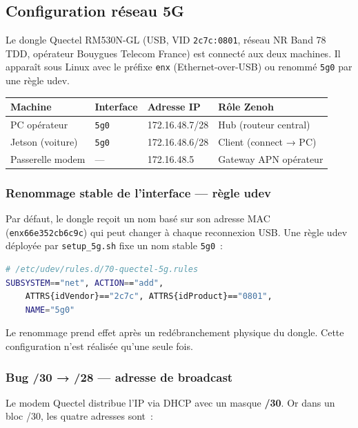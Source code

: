 \documentclass[a4paper,11pt]{article}
\begin{document}
\subsection{Configuration réseau 5G}

Le dongle Quectel RM530N-GL (USB, VID \texttt{2c7c:0801}, réseau NR Band 78 TDD,
opérateur Bouygues Telecom France) est connecté aux deux machines.
Il apparaît sous Linux avec le préfixe \texttt{enx} (Ethernet-over-USB) ou renommé
\texttt{5g0} par une règle udev.

\begin{center}
\begin{tabular}{llll}
\toprule
\textbf{Machine} & \textbf{Interface} & \textbf{Adresse IP} & \textbf{Rôle Zenoh} \\
\midrule
PC opérateur     & \texttt{5g0}       & 172.16.48.7/28  & Hub (routeur central) \\
Jetson (voiture) & \texttt{5g0}       & 172.16.48.6/28  & Client (connect → PC) \\
Passerelle modem & —                  & 172.16.48.5     & Gateway APN opérateur \\
\bottomrule
\end{tabular}
\end{center}

\subsubsection{Renommage stable de l'interface — règle udev}

Par défaut, le dongle reçoit un nom basé sur son adresse MAC
(\texttt{enx66e352cb6c9c}) qui peut changer à chaque reconnexion USB.
Une règle udev déployée par \texttt{setup\_5g.sh} fixe un nom stable \texttt{5g0}~:

\begin{lstlisting}[language=bash]
# /etc/udev/rules.d/70-quectel-5g.rules
SUBSYSTEM=="net", ACTION=="add",
    ATTRS{idVendor}=="2c7c", ATTRS{idProduct}=="0801",
    NAME="5g0"
\end{lstlisting}

Le renommage prend effet après un redébranchement physique du dongle. Cette
configuration n'est réalisée qu'une seule fois.

\subsubsection{Bug /30 → /28 — adresse de broadcast}

Le modem Quectel distribue l'IP via DHCP avec un masque \textbf{/30}. Or dans un
bloc /30, les quatre adresses sont~:
\end{document}
